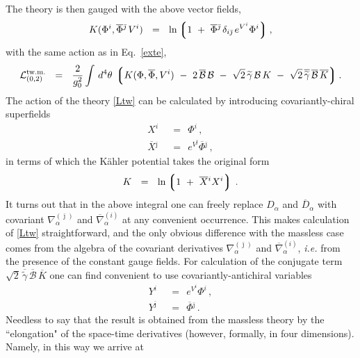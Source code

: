 \documentclass[12pt]{article}
\def\beq{\begin{equation}}
\def\eeq{\end{equation}}
\newcommand{\wt}{\widetilde}
\newcommand{\ov}{\overline}
\newcommand{\mc}[1]{\mathcal{#1}}
\newcommand{\lgr}{\left\lgroup}
\newcommand{\rgr}{\right\rgroup}
\newcommand{\tgamma}{\wt{\gamma}}
\newcommand{\bj}{{\bar \jmath}}
\begin{document}
	The theory is then gauged with the above vector fields,
\[
	K(\Phi^i, \ov{\Phi}{}^\bj\, V^i) ~~=~~
		\ln \lgr 1 ~+~ \ov{\Phi}{}^\bj\, \delta_{i\bj}\, e^{V^i} \Phi^i \rgr ,
\]	
	with the same action as in Eq.~\eqref{exte},
\beq
\label{Ltw}
	\mc{L}_{(0,2)}^\text{tw.m.} ~~=~~ \frac{2}{g_0^2} \int\, d^4\theta\, \lgr K(\Phi,\ov{\Phi}, V^i) 
		~-~ 2\, \ov{\mc{B}}\,\mc{B}  
		~-~  \sqrt{2}\, \tgamma\,\mc{B}\,K  ~-~ \sqrt{2}\, \ov{\tgamma}\,\ov{\mc{B}}\,\ov{K} \rgr.
\eeq
	The action of the theory \eqref{Ltw} can be calculated by introducing covariantly-chiral superfields
\begin{align*}
%
	X^i & ~~=~~ \Phi^i\,, \\
%
	\ov{X}{}^\bj & ~~=~~ e^{V^\bj} \ov{\Phi}{}^\bj\,,
\end{align*}
	in terms of which the K\"{a}hler potential takes the original form
\[
	K ~~=~~ \ln \lgr 1 ~+~ \ov{X}{}^i X^i \rgr\,.
\]
	It turns out that in the above integral one can freely replace $ D_\alpha $ and $ \ov{D}{}_\alpha $ with
	covariant $ \nabla^{(\bj)}_\alpha $ and $ \ov{\nabla}{}^{(i)}_\alpha $ at any convenient occurrence.
	This makes calculation of \eqref{Ltw} straightforward, and the only obvious difference with the massless
	case comes from the algebra of the covariant derivatives $ \nabla^{(\bj)}_\alpha $ and 
	$ \ov{\nabla}{}^{(i)}_\alpha $, {\it i.e.} from the presence of the constant gauge fields.
	For calculation of the conjugate term $ \sqrt{2}\, \ov{\tgamma}\,\ov{\mc{B}}\,\ov{K} $ one can find convenient to 
	use covariantly-antichiral variables
\begin{align*}
%
	Y^i & ~~=~~ e^{V^i} \Phi^i\,, \\
%
	Y^\bj & ~~=~~ \ov{\Phi}{}^\bj\,.
\end{align*}
	Needless to say that the result is obtained from the massless theory by the ``elongation" 
	of the space-time derivatives (however, formally, in four dimensions). Namely, in this way we arrive at
\end{document}
